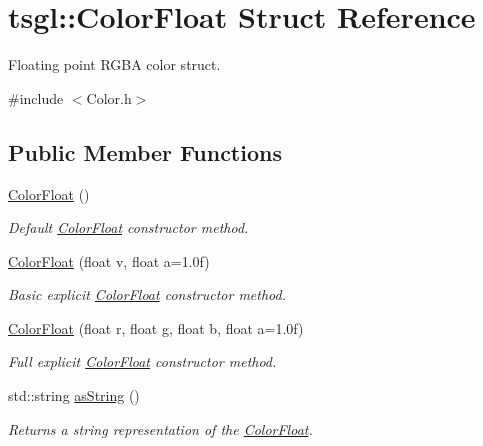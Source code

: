 \hypertarget{structtsgl_1_1_color_float}{\section{tsgl\-:\-:\-Color\-Float \-Struct \-Reference}
\label{structtsgl_1_1_color_float}
}


\-Floating point \-R\-G\-B\-A color struct.  




{\ttfamily \#include $<$\-Color.\-h$>$}

\subsection*{\-Public \-Member \-Functions}
\begin{DoxyCompactItemize}
\item 
\hyperlink{structtsgl_1_1_color_float_a22e82c71a0feedbb7b3e3a7a73b80e30}{\-Color\-Float} ()
\begin{DoxyCompactList}\small\item\em \-Default \hyperlink{structtsgl_1_1_color_float}{\-Color\-Float} constructor method. \end{DoxyCompactList}\item 
\hyperlink{structtsgl_1_1_color_float_a134643b43f1d8acaed32095f04942140}{\-Color\-Float} (float v, float a=1.\-0f)
\begin{DoxyCompactList}\small\item\em \-Basic explicit \hyperlink{structtsgl_1_1_color_float}{\-Color\-Float} constructor method. \end{DoxyCompactList}\item 
\hyperlink{structtsgl_1_1_color_float_a6c46a2073d9e208aa3f07cc04565a489}{\-Color\-Float} (float r, float g, float b, float a=1.\-0f)
\begin{DoxyCompactList}\small\item\em \-Full explicit \hyperlink{structtsgl_1_1_color_float}{\-Color\-Float} constructor method. \end{DoxyCompactList}\item 
std\-::string \hyperlink{structtsgl_1_1_color_float_a1048e8773d65fa1554bc8782e76527ed}{as\-String} ()
\begin{DoxyCompactList}\small\item\em \-Returns a string representation of the \hyperlink{structtsgl_1_1_color_float}{\-Color\-Float}. \end{DoxyCompactList}\item 

\end{DoxyCompactItemize}
